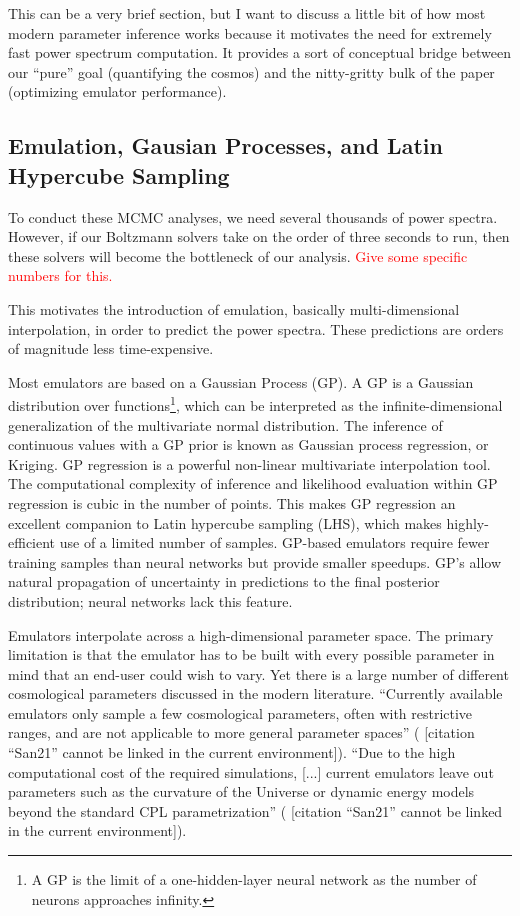 \documentclass[11pt]{article}
\newcommand{\cbib}[1]
{\IfFileExists{biblatex.sty}
{\cite{#1}}
{[citation ``#1'' cannot be linked in the current environment]}}
\begin{document}
This can be a very brief section, but I want to discuss a little bit of how most modern parameter inference works because it motivates the need for extremely fast power spectrum computation. It provides a sort of conceptual bridge between our ``pure'' goal (quantifying the cosmos) and the nitty-gritty bulk of the paper (optimizing emulator performance).

\begin{centering}
\label{sec: state_of_the_art}
\subsection{Emulation, Gausian Processes, and Latin Hypercube Sampling}
\end{centering}

To conduct these MCMC analyses, we need several thousands of power spectra. However, if our Boltzmann solvers take on the order of three seconds to run, then these solvers will become the bottleneck of our analysis. \textcolor{red}{Give some specific numbers for this.}

This motivates the introduction of emulation, basically multi-dimensional interpolation, in order to predict the power spectra. These predictions are orders of magnitude less time-expensive. 

Most emulators are based on a Gaussian Process (GP). A GP is a Gaussian
distribution over functions\footnote
{A GP is the limit of a one-hidden-layer neural network as the number of
neurons approaches infinity.}, which can be interpreted
as the infinite-dimensional generalization of the multivariate normal
distribution. The inference of continuous values with a GP prior
is known as Gaussian process regression, or Kriging. GP regression is a
powerful non-linear multivariate interpolation tool. The computational
complexity of inference and likelihood evaluation within GP regression is cubic
in the number of points. This makes GP regression an excellent companion to
Latin hypercube sampling (LHS), which makes highly-efficient use of a limited number of samples. GP-based emulators require fewer training samples than
neural networks but provide smaller speedups. GP's allow natural propagation of
uncertainty in predictions to the final posterior distribution; neural
networks lack this feature.

Emulators interpolate across a high-dimensional parameter space. The primary
limitation is that the emulator has to be built with every possible parameter
in mind that an end-user could wish to vary. Yet there is a large number of
different cosmological parameters discussed in the modern literature.
``Currently available emulators only sample a few cosmological parameters,
often with restrictive ranges, and are not applicable to more general parameter
spaces'' (\cbib{San21}). ``Due to the high computational cost of the required
simulations, [...] current emulators leave out parameters such as the curvature
of the Universe or dynamic energy models beyond the standard CPL
parametrization'' (\cbib{San21}).
\end{document}
